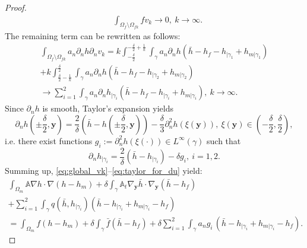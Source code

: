 \documentclass[a4paper]{article}
\def\vc#1{\mathbf{\boldsymbol{#1}}}     %
\def\tn#1{{\mathbb{#1}}}    %
\def\yy{{\vc y}}
\begin{document}
\begin{proof}
\begin{align}
&\int_{\Omega_f\setminus\Omega_{fk}} f v_k \to 0,~k\to\infty.
\end{align}
The remaining term can be rewritten as follows:
\begin{multline}
\int_{\Omega_f\setminus\Omega_{fk}} a_n\partial_n h \partial_n v_k
= k\int_{-\frac\delta2}^{-\frac\delta2+\frac1k}\int_\gamma a_n\partial_n h (\bar h - h_f - h_{|\gamma_1} + h_{m|\gamma_1})\\
+ k\int_{\frac\delta2-\frac1k}^{\frac\delta2}\int_\gamma a_n\partial_n h (\bar h - h_f - h_{|\gamma_2} + h_{m|\gamma_2})\\
\to \sum_{i=1}^2\int_\gamma a_n \partial_n h_{|\gamma_i} (\bar h - h_f - h_{|\gamma_i} + h_{m|\gamma_i}),~k\to\infty.
\end{multline}
Since $\partial_n h$ is smooth, Taylor's expansion yields
\[ \partial_n h(\pm\frac\delta2,\vc y) = \frac2\delta(\bar h - h(\pm\frac\delta2,\vc y)) - \frac\delta3\partial_n^2 h(\xi(\vc y)),~\xi(\yy)\in(-\frac\delta2,\frac\delta2), \]
i.e. there exist functions $g_i:=\partial^2_n h(\xi(\cdot))\in L^\infty(\gamma)$ such that
\begin{equation}
\label{eq:taylor_for_du}
\partial_n h_{|\gamma_i} = \frac2\delta(\bar h - h_{|\gamma_i}) - \delta g_i,~i=1,2.
\end{equation}
Summing up, \eqref{eq:global_vk}--\eqref{eq:taylor_for_du} yield:
\begin{multline}
\label{eq:sum_global_vk_limit}
\int_{\Omega_m}\tn A\nabla h\cdot\nabla(h-h_m)
+\delta\int_\gamma\tn A_t\nabla_\yy\bar h\cdot\nabla_\yy(\bar h-h_f)\\
+ \sum_{i=1}^2\int_\gamma q(\bar h,h_{|\gamma_i}) (\bar h - h_{|\gamma_i} + h_{m|\gamma_i} - h_f)\\
= \int_{\Omega_m} f (h-h_m)
+ \delta\int_{\gamma} \bar f (\bar h-h_f)
+ \delta\sum_{i=1}^2\int_\gamma a_n g_i\, (\bar h - h_{|\gamma_i} + h_{m|\gamma_i} - h_f).
\end{multline}


\end{proof}
\end{document}
